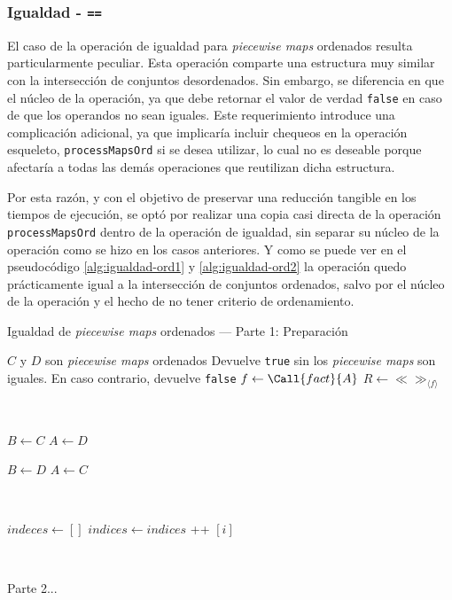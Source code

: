\subsubsection{Igualdad - \texttt{==}}

El caso de la operación de igualdad para \textit{piecewise maps} ordenados resulta particularmente peculiar. Esta operación comparte una estructura muy similar con la intersección de conjuntos desordenados. Sin embargo, se diferencia en que el núcleo de la operación, ya que debe retornar el valor de verdad \texttt{false} en caso de que los operandos no sean iguales. Este requerimiento introduce una complicación adicional, ya que implicaría incluir chequeos en la operación esqueleto, \texttt{processMapsOrd} si se desea utilizar, lo cual no es deseable porque afectaría a todas las demás operaciones que reutilizan dicha estructura.

Por esta razón, y con el objetivo de preservar una reducción tangible en los tiempos de ejecución, se optó por realizar una copia casi directa de la operación \texttt{processMapsOrd} dentro de la operación de igualdad, sin separar su núcleo de la operación como se hizo en los casos anteriores. Y como se puede ver en el pseudocódigo \ref{alg:igualdad-ord1} y \ref{alg:igualdad-ord2} la operación quedo prácticamente igual a la intersección de conjuntos ordenados, salvo por el núcleo de la operación y el hecho de no tener criterio de ordenamiento.

\begin{algorithm}
\caption{Igualdad de \textit{piecewise maps} ordenados — Parte 1: Preparación}
\label{alg:igualdad-ord1}
\begin{algorithmic}[1]
\Require $C$ y $D$ son \textit{piecewise maps} ordenados
\Ensure Devuelve \texttt{true} sin los \textit{piecewise maps} son iguales. En caso contrario, devuelve \texttt{false}
    \State $f \gets \Call{fact}{A}$
    \State $R \gets \ll\gg_{\langle f \rangle}$

        \State {}
    \EndIf

        \State {}
    \EndIf
          
    \
    
    \State $B \gets C$
    \State $A \gets D$

        \State $B \gets D$
        \State $A \gets C$
    \EndIf
        
    \
    
    \State $indeces \gets []$ 
        \State $indices \gets indices$  \!+\!+  $[i]$
    \EndFor
        
    \

    \State Parte 2...
\EndFunction
\end{algorithmic}
\end{algorithm}

